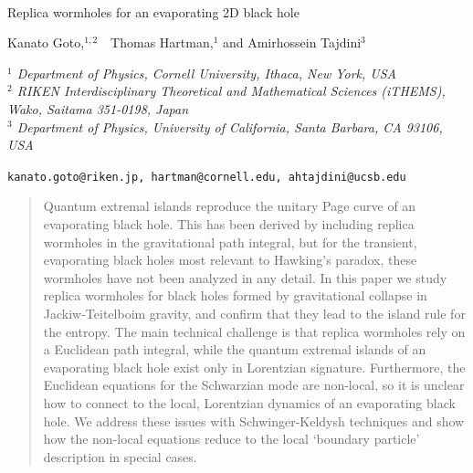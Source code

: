 \documentclass[12pt]{article}
\numberwithin{equation}{section}
\begin{document}
\begin{spacing}{1.1}
\begin{center}

~
\vskip1cm

{\LARGE {
Replica wormholes for an evaporating 2D black hole
\ \\
}}

\vskip10mm

Kanato Goto,$^{1,2}$\ \ Thomas Hartman,$^{1}$  and Amirhossein Tajdini$^{3}$

\vskip5mm

{\it $^1$ Department of Physics, Cornell University, Ithaca, New York, USA
}  \\ \bigskip
{\it $^2$ RIKEN Interdisciplinary Theoretical and Mathematical Sciences (iTHEMS),\\ 
Wako, Saitama 351-0198, Japan } \\  \bigskip
{\it $^3$ Department of Physics, University of California, Santa Barbara, CA 93106, USA
}
\vskip5mm

{\tt  kanato.goto@riken.jp, hartman@cornell.edu, ahtajdini@ucsb.edu}

\vskip5mm





\end{center}

\vspace{4mm}
\begin{abstract}
\noindent
 Quantum extremal islands reproduce the unitary Page curve of an evaporating black hole. 
This has been derived by including replica wormholes in the gravitational path integral, but for the transient, evaporating black holes most relevant to Hawking's paradox, these wormholes have not been analyzed in any detail. In this paper we study replica wormholes for black holes formed by gravitational collapse in Jackiw-Teitelboim gravity, and confirm that they lead to the island rule for the entropy. The main technical challenge is that replica wormholes rely on a Euclidean path integral, while the quantum extremal islands of an evaporating black hole exist only in Lorentzian signature. Furthermore, the Euclidean equations for the Schwarzian mode are non-local, so it is unclear how to connect to the local, Lorentzian dynamics of an evaporating black hole.
We address these issues with Schwinger-Keldysh techniques and show how the non-local equations reduce to the local `boundary particle' description in special cases.


 \end{abstract}


\pagebreak
\pagestyle{plain}

\setcounter{tocdepth}{2}
{}
\vfill

\end{spacing}
\end{document}
